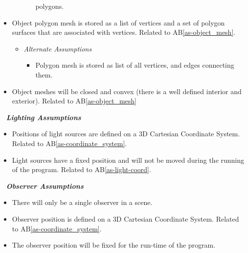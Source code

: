 \documentclass[12pt]{article}
\newcounter{assumpnum} %
\newcounter{assumpnumB} %
\newcommand{\aBref}[1]{AB\ref{#1}}
\begin{document}
\begin{itemize}
\begin{itemize}
\begin{itemize}
			polygons.
		\end{itemize}
	\end{itemize}			
	\item[AB\refstepcounter{assumpnumB}\theassumpnumB\label{as-poly-mesh-store}:]
	Object polygon mesh is stored as a list of vertices and a set of polygon 
	surfaces that are associated with vertices. Related to 
	\aBref{as-object_mesh}.
	\begin{itemize}
		\item[] \textit{Alternate Assumptions}
		\begin{itemize}
			\item Polygon mesh is stored as list of all vertices, and edges 
			connecting them.
		\end{itemize}
	\end{itemize}		
	\item[AB\refstepcounter{assumpnumB}\theassumpnumB\label{as-object_representation2}:]
	Object meshes will be closed and convex (there is a well defined interior 
	and exterior). Related to \aBref{as-object_mesh}
\end{itemize}

~\newline
\textbf{\emph{Lighting Assumptions}}
\begin{itemize}
	\item[AB\refstepcounter{assumpnumB}\theassumpnumB\label{as-light-coord}:]
	Positions of light sources are defined on a 3D Cartesian Coordinate System. 
	Related to \aBref{as-coordinate_system}.
	\item[AB\refstepcounter{assumpnumB}\theassumpnumB\label{as-light-fixed}:]
	Light sources have a fixed position and will not be moved during the 
	running of the program.	Related to \aBref{as-light-coord}.
\end{itemize}

~\newline
\textbf{\emph{Observer Assumptions}}
\begin{itemize}
	\item[AB\refstepcounter{assumpnumB}\theassumpnumB\label{as-obsv_total}:]
	There will only be a single observer in a scene.
	\item[AB\refstepcounter{assumpnumB}\theassumpnumB\label{as-obsv-coord}:]
	Observer position is defined on a 3D Cartesian Coordinate System. 
	Related to \aBref{as-coordinate_system}.
	\item[AB\refstepcounter{assumpnumB}\theassumpnumB\label{as-obsv_move}:]
	The observer position will be fixed for the run-time of the program.
\end{itemize}
\end{document}
